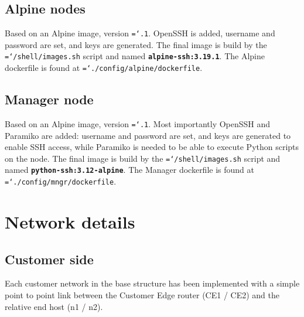 \documentclass{report}
\newcommand{\monospaced}[1]{\texttt{\hyphenchar\font=`\-#1}}
\newcommand{\monobold}[1]{\texttt{\textbf{#1}}}
\begin{document}
\subsection{Alpine nodes}\label{sec:img_alp}
Based on an Alpine image, version \monospaced{3.19.1}. OpenSSH is added, username and password are set, and keys are generated. The final image is build by the \monospaced{/shell/images.sh} script and named \monobold{alpine-ssh:3.19.1}.\newline
The Alpine dockerfile is found at \monospaced{./config/alpine/dockerfile}.
\subsection{Manager node}\label{sec:img_pyt}
Based on an Alpine image, version \monospaced{3.19.1}. Most importantly OpenSSH and Paramiko are added: username and password are set, and keys are generated to enable SSH access, while Paramiko is needed to be able to execute Python scripts on the node. The final image is build by the \monospaced{/shell/images.sh} script and named \monobold{python-ssh:3.12-alpine}.\newline
The Manager dockerfile is found at \monospaced{./config/mngr/dockerfile}.


\section{Network details}\label{sec:net_details}
\subsection{Customer side}
Each customer network in the base structure has been implemented with a simple point to point link between the Customer Edge router (CE1 / CE2) and the relative end host (n1 / n2).
\end{document}
